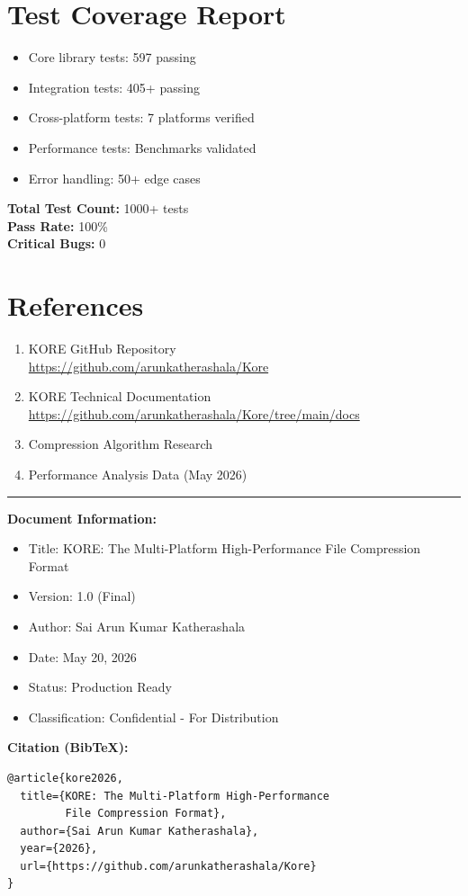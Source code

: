 \documentclass[12pt,a4paper]{report}
\begin{document}
\chapter{Test Coverage Report}

\begin{itemize}
    \item Core library tests: 597 passing
    \item Integration tests: 405+ passing
    \item Cross-platform tests: 7 platforms verified
    \item Performance tests: Benchmarks validated
    \item Error handling: 50+ edge cases
\end{itemize}

\textbf{Total Test Count:} 1000+ tests \\
\textbf{Pass Rate:} 100\% \\
\textbf{Critical Bugs:} 0 \\

\chapter{References}

\begin{enumerate}
    \item KORE GitHub Repository \\
    \url{https://github.com/arunkatherashala/Kore}
    
    \item KORE Technical Documentation \\
    \url{https://github.com/arunkatherashala/Kore/tree/main/docs}
    
    \item Compression Algorithm Research
    
    \item Performance Analysis Data (May 2026)
\end{enumerate}

\vfill
\noindent
\rule{\textwidth}{0.5pt}

\noindent
\textbf{Document Information:}
\begin{itemize}
    \item Title: KORE: The Multi-Platform High-Performance File Compression Format
    \item Version: 1.0 (Final)
    \item Author: Sai Arun Kumar Katherashala
    \item Date: May 20, 2026
    \item Status: Production Ready
    \item Classification: Confidential - For Distribution
\end{itemize}

\noindent
\textbf{Citation (BibTeX):}
\begin{verbatim}
@article{kore2026,
  title={KORE: The Multi-Platform High-Performance 
         File Compression Format},
  author={Sai Arun Kumar Katherashala},
  year={2026},
  url={https://github.com/arunkatherashala/Kore}
}
\end{verbatim}
\end{document}
